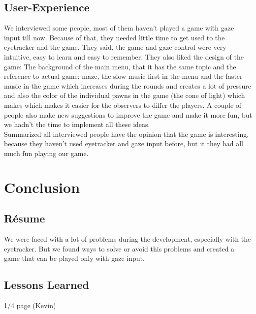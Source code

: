 \documentclass{sigchi}
\begin{document}
\subsection{User-Experience}
We interviewed some people, most of them haven't played a game with gaze input till now. Because of that, they needed little time to get used to the eyetracker and the game. They said, the game and gaze control were very intuitive, easy to learn and easy to remember. They also liked the design of the game: The background of the main menu, that it has the same topic and the reference to actual game: maze, the slow music first in the menu and the faster music in the game which increases during the rounds and creates a lot of pressure and also the color of the individual pawns in the game (the cone of light) which makes which makes it easier for the observers to differ the players.
A couple of people also make new suggestions to improve the game and make it more fun, but we hadn't the time to implement all these ideas.\\
Summarized all interviewed people have the opinion that the game is interesting, because they haven't used eyetracker and gaze input before, but it they had all much fun playing our game.

\section{Conclusion}
\subsection{R{\'e}sume}
We were faced with a lot of problems during the development, especially with the eyetracker. But we found ways to solve or avoid this problems and created a game that can be played only with gaze input.
\subsection{Lessons Learned}
1/4 page (Kevin)
\end{document}
